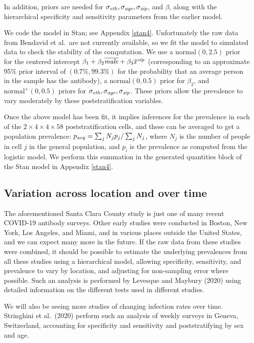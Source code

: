 \documentclass[11pt]{article}
\begin{document}
In addition, priors are needed for $\sigma_{\it eth}, \sigma_{\it age},\sigma_{\it zip}$, and $\beta$, along with the hierarchical specificity and sensitivity parameters from the earlier model.

We code the model in Stan; see Appendix \ref{stan4}.  Unfortunately the raw data from Bendavid et al.\  are not currently available, so we fit the model to simulated data to check the stability of the computation.  We use a $\mbox{normal}(0,2.5)$ prior for the centered intercept  $\beta_1 + \beta_2\overline{\it male} + \beta_3\overline{x}^{\it zip}$ (corresponding to an approximate 95\% prior interval of $(0.7\%, 99.3\%)$ for the probability that an average person in the sample has the antibody), a $\mbox{normal}(0,0.5)$ prior for $\beta_2$, and $\mbox{normal}^+(0, 0.5)$ priors for $\sigma_{\it eth}, \sigma_{\it age},\sigma_{\it zip}$.  These priors allow the prevalence to vary moderately by these poststratification variables.

Once the above model has been fit, it implies inferences for the prevalence in each of the $2\times 4 \times 4 \times 58$ poststratification cells, and these can be averaged to get a population prevalence:  $p_{\it avg} = \sum_jN_jp_j/\sum_jN_j$, where $N_j$ is the number of people in cell $j$ in the general population, and $p_i$ is the prevalence as computed from the logistic model.  We perform this summation in the generated quantities block of the Stan model in Appendix \ref{stan4}.

\subsection{Variation across location and over time}\label{muiltiple}
The aforementioned Santa Clara County study is just one of many recent COVID-19 antibody surveys.  Other early studies were conducted in Boston, New York, Los Angeles, and Miami, and in various places outside the United States, and we can expect many more in the future.  If the raw data from these studies were combined, it should be possible to estimate the underlying prevalences from all these studies using a hierarchical model, allowing specificity, sensitivity, and prevalence to vary by location, and adjusting for non-sampling error where possible.  Such an analysis is performed by Levesque and Maybury (2020) using detailed information on the different tests used in different studies.

We will also be seeing more studies of changing infection rates over time.  Stringhini et al.\ (2020) perform such an analysis of weekly surveys in Geneva, Switzerland, accounting for specificity and sensitivity and poststratifying by sex and age.
\end{document}
